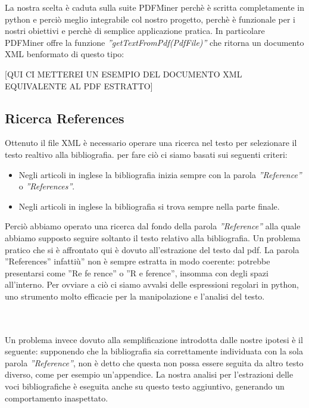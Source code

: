 La nostra scelta è caduta sulla suite PDFMiner perchè è scritta completamente in python e perciò meglio integrabile col nostro progetto, perchè è funzionale per i nostri obiettivi e perchè di semplice applicazione pratica.
In particolare PDFMiner offre la funzione \textit{''getTextFromPdf(PdfFile)''} che ritorna un documento XML benformato di questo tipo:

[QUI CI METTEREI UN ESEMPIO DEL DOCUMENTO XML EQUIVALENTE AL PDF ESTRATTO]


\subsection{Ricerca References}

Ottenuto il file XML è necessario operare una ricerca nel testo per selezionare il testo realtivo alla bibliografia.
per fare ciò ci siamo basati sui seguenti criteri:
\begin{itemize}
 \item Negli articoli in inglese la bibliografia inizia sempre con la parola \textit{''Reference''} o \textit{''References''}.
 \item Negli articoli in inglese la bibliografia si trova sempre nella parte finale.
\end{itemize}

Perciò abbiamo operato una ricerca dal fondo della parola \textit{''Reference''} alla quale abbiamo supposto seguire soltanto il testo relativo alla bibliografia. 
Un problema pratico che si è affrontato qui è dovuto all'estrazione del testo dal pdf. La parola ''References'' infattiù'' non è sempre estratta in modo coerente: potrebbe presentarsi come ''Re fe rence'' o ''R e ference'', insomma con degli spazi all'interno. Per ovviare a ciò ci siamo avvalsi delle espressioni regolari in python, uno strumento molto efficacie per la manipolazione e l'analisi del testo.

\\
[Sottosezione e regressione sulle RegExp con esempio di nostro utilizzo???]
\\

Un problema invece dovuto alla semplificazione introdotta dalle nostre ipotesi è il seguente: supponendo che la bibliografia sia correttamente individuata con la sola parola \textit{''Reference''}, non è detto che questa non possa essere seguita da altro testo diverso, come per esempio un'appendice. La nostra analisi per l'estrazioni delle voci bibliografiche è eseguita anche su questo testo aggiuntivo, generando un comportamento inaspettato.



